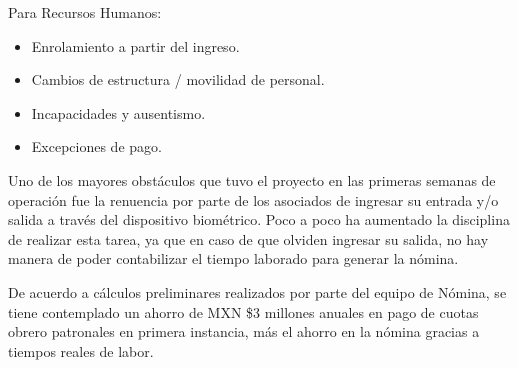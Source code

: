 Para Recursos Humanos:

\begin{itemize}
 \item Enrolamiento a partir del ingreso.
 \item Cambios de estructura / movilidad de personal.
 \item Incapacidades y ausentismo.
 \item Excepciones de pago.
\end{itemize}

Uno de los mayores obstáculos que tuvo el proyecto en las primeras semanas de operación fue la renuencia por parte de los asociados de ingresar su entrada y/o salida a través del dispositivo biométrico. Poco a poco ha aumentado la disciplina de realizar esta tarea, ya que en caso de que olviden ingresar su salida, no hay manera de poder contabilizar el tiempo laborado para generar la nómina.

De acuerdo a cálculos preliminares realizados por parte del equipo de Nómina, se tiene contemplado un ahorro de MXN \$3 millones anuales en pago de cuotas obrero patronales en primera instancia, más el ahorro en la nómina gracias a tiempos reales de labor.

